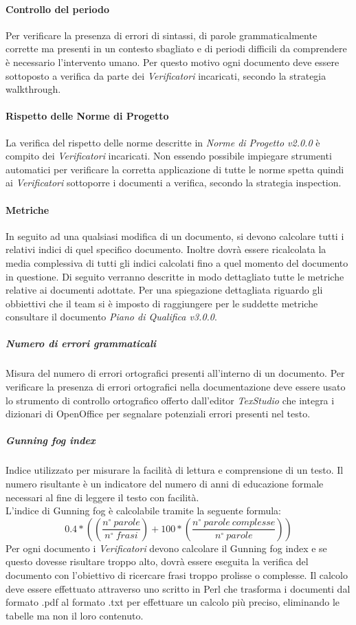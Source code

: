 \paragraph{Controllo del periodo} \Spazio
Per verificare la presenza di errori di sintassi, di parole grammaticalmente corrette ma presenti in un contesto sbagliato e di periodi difficili da comprendere è necessario l'intervento umano. Per questo motivo ogni documento deve essere sottoposto a verifica da parte dei \emph{Verificatori} incaricati, secondo la strategia walkthrough.

\paragraph{Rispetto delle Norme di Progetto} \Spazio
La verifica del rispetto delle norme descritte in \emph{Norme di Progetto v2.0.0} è compito dei \emph{Verificatori} incaricati. Non essendo possibile impiegare strumenti automatici per verificare la corretta applicazione di tutte le norme spetta quindi ai \emph{Verificatori} sottoporre i documenti a verifica, secondo la strategia inspection.

\paragraph{Metriche} \Spazio
In seguito ad una qualsiasi modifica di un documento, si devono calcolare tutti i relativi indici di quel specifico documento. Inoltre dovrà essere ricalcolata la media complessiva di tutti gli indici calcolati fino a quel momento del documento in questione.
Di seguito verranno descritte in modo dettagliato tutte le metriche relative ai documenti adottate. Per una spiegazione dettagliata riguardo gli obbiettivi che il team si è imposto di raggiungere per le suddette metriche consultare il documento \emph{Piano di Qualifica v3.0.0}.
\subparagraph{Numero di errori grammaticali}\Spazio
Misura del numero di errori ortografici presenti all'interno di un documento.
Per verificare la presenza di errori ortografici nella documentazione deve essere usato lo strumento di controllo ortografico offerto dall'editor \emph{TexStudio} che integra i dizionari di OpenOffice per segnalare potenziali errori presenti nel testo.

\subparagraph{Gunning fog index}\Spazio
Indice utilizzato per misurare la facilità di lettura e comprensione di un testo. Il numero risultante è un indicatore del numero di anni di educazione formale necessari al fine di leggere il testo con facilità. \\
L'indice di Gunning fog è calcolabile tramite la seguente formula:
$$
0.4*((\frac{n^{\circ}\:parole}{n^{\circ}\:frasi})+100*(\frac{n^{\circ}\:parole\:complesse}{n^{\circ}\:parole}))
$$
Per ogni documento i \emph{Verificatori} devono calcolare il Gunning fog index e se questo dovesse risultare troppo alto, dovrà essere eseguita la verifica del documento con l'obiettivo di ricercare frasi troppo prolisse o complesse. Il calcolo deve essere effettuato attraverso uno  scritto in Perl che trasforma i documenti dal formato .pdf al formato .txt per effettuare un calcolo più preciso, eliminando le tabelle ma non il loro contenuto.


